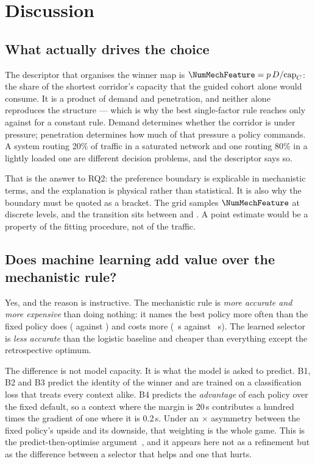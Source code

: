 \section{Discussion}

\subsection{What actually drives the choice}

The descriptor that organises the winner map is $\NumMechFeature = p\,D /
\mathrm{cap}_C$: the share of the shortest corridor's capacity that the guided
cohort alone would consume. It is a product of demand and penetration, and
neither alone reproduces the structure --- which is why the best single-factor
rule reaches only \NumWinMapOne{} against \NumWinMapConst{} for a constant
rule. Demand determines whether the corridor is under pressure; penetration
determines how much of that pressure a policy commands. A system routing 20\% of
traffic in a saturated network and one routing 80\% in a lightly loaded one are
different decision problems, and the descriptor says so.

That is the answer to RQ2: the preference boundary is explicable in mechanistic
terms, and the explanation is physical rather than statistical. It is also why
the boundary must be quoted as a bracket. The grid samples
$\NumMechFeature$ at discrete levels, and the transition sits between
\NumMechBracketLo{} and \NumMechBracketHi{}. A point estimate would be a
property of the fitting procedure, not of the traffic.

\subsection{Does machine learning add value over the mechanistic rule?}

Yes, and the reason is instructive. The mechanistic rule is \emph{more accurate
and more expensive} than doing nothing: it names the best policy more often than
the fixed policy does (\NumBOneTopOne{} against \NumBZeroTopOne{}) and costs
more (\NumBOneRegret~s against \NumBZeroRegret~s). The learned selector is
\emph{less accurate} than the logistic baseline and cheaper than everything
except the retrospective optimum.

The difference is not model capacity. It is what the model is asked to predict.
B1, B2 and B3 predict the identity of the winner and are trained on a
classification loss that treats every context alike. B4 predicts the
\emph{advantage} of each policy over the fixed default, so a context where the
margin is 20\,s contributes a hundred times the gradient of one where it is
0.2\,s. Under an \NumAsymRatio$\times$ asymmetry between the fixed policy's
upside and its downside, that weighting is the whole game. This is the
predict-then-optimise argument~\cite{elmachtoub2022spo}, and it appears here not
as a refinement but as the difference between a selector that helps and one that
hurts.


